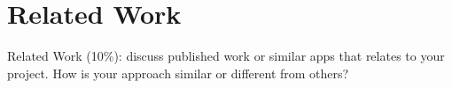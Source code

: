 \section{Related Work}
Related Work (10\%): discuss published work or similar apps that relates to your project. How is your approach similar or different from others?
